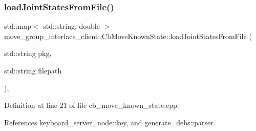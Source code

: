 \subsubsection{\texorpdfstring{load\+Joint\+States\+From\+File()}{loadJointStatesFromFile()}}
{\footnotesize\ttfamily std\+::map$<$ std\+::string, double $>$ move\+\_\+group\+\_\+interface\+\_\+client\+::\+Cb\+Move\+Known\+State\+::load\+Joint\+States\+From\+File (\begin{DoxyParamCaption}\item[{std\+::string}]{pkg,  }\item[{std\+::string}]{filepath }\end{DoxyParamCaption})\hspace{0.3cm}{\ttfamily [static]}, {\ttfamily [private]}}



Definition at line 21 of file cb\+\_\+move\+\_\+known\+\_\+state.\+cpp.



References keyboard\+\_\+server\+\_\+node\+::key, and generate\+\_\+debs\+::parser.


